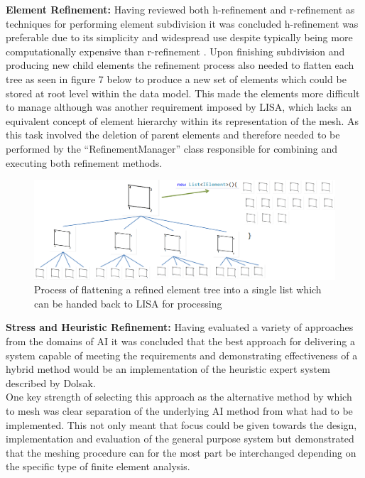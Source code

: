 \noindent
\textbf{Element Refinement: }  Having reviewed both h-refinement \cite{HandPRefinements} and r-refinement \cite{RRefinement} as techniques for performing element subdivision it was concluded h-refinement was preferable due to its simplicity and widespread use despite typically being more computationally expensive than r-refinement \cite{HandPRefinements} \cite{RRefinement}. 
Upon finishing subdivision and producing new child elements the refinement process also needed to flatten each tree as seen in figure 7 below to produce a new set of elements which could be stored at root level within the data model. This made the elements more difficult to manage although was another requirement imposed by LISA, which lacks an equivalent concept of element hierarchy within its representation of the mesh. As this task involved the deletion of parent elements and therefore needed to be performed by the ``RefinementManager'' class responsible for combining and executing both refinement methods. \\

\begin{figure}[!h]
  \centerline{\includegraphics[width=150mm, scale=1]{../Graphics/ElemFlattening.png}}
  \caption{Process of flattening a refined element tree into a single list which can be handed back to LISA for processing}
  \label{fig:h-refinementImp}
\end{figure}

\noindent
\textbf{Stress and Heuristic Refinement: } Having evaluated a variety of approaches from the domains of AI it was concluded that the best approach for delivering a system capable of meeting the requirements and demonstrating effectiveness of a hybrid method would be an implementation of the heuristic expert system described by Dolsak. \\ 

\noindent
One key strength of selecting this approach as the alternative method by which to mesh was clear separation of the underlying AI method from what had to be implemented. This not only meant that focus could be given towards the design, implementation and evaluation of the general purpose system but demonstrated that the meshing procedure can for the most part be interchanged depending on the specific type of finite element analysis. \\ 




